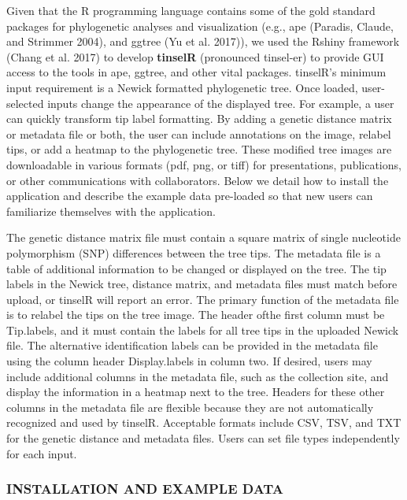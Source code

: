 \documentclass[
]{article}
\begin{document}
Given that the R programming language contains some of the gold standard
packages for phylogenetic analyses and visualization (e.g., ape
(Paradis, Claude, and Strimmer 2004), and ggtree (Yu et al. 2017)), we
used the Rshiny framework (Chang et al. 2017) to develop
\textbf{tinselR} (pronounced tinsel-er) to provide GUI access to the
tools in ape, ggtree, and other vital packages. tinselR's minimum input
requirement is a Newick formatted phylogenetic tree. Once loaded,
user-selected inputs change the appearance of the displayed tree. For
example, a user can quickly transform tip label formatting. By adding a
genetic distance matrix or metadata file or both, the user can include
annotations on the image, relabel tips, or add a heatmap to the
phylogenetic tree. These modified tree images are downloadable in
various formats (pdf, png, or tiff) for presentations, publications, or
other communications with collaborators. Below we detail how to install
the application and describe the example data pre-loaded so that new
users can familiarize themselves with the application.

The genetic distance matrix file must contain a square matrix of single
nucleotide polymorphism (SNP) differences between the tree tips. The
metadata file is a table of additional information to be changed or
displayed on the tree. The tip labels in the Newick tree, distance
matrix, and metadata files must match before upload, or tinselR will
report an error. The primary function of the metadata file is to relabel
the tips on the tree image. The header ofthe first column must be
Tip.labels, and it must contain the labels for all tree tips in the
uploaded Newick file. The alternative identification labels can be
provided in the metadata file using the column header Display.labels in
column two. If desired, users may include additional columns in the
metadata file, such as the collection site, and display the information
in a heatmap next to the tree. Headers for these other columns in the
metadata file are flexible because they are not automatically recognized
and used by tinselR. Acceptable formats include CSV, TSV, and TXT for
the genetic distance and metadata files. Users can set file types
independently for each input.

\hypertarget{installation-and-example-data}{%
\subsubsection{INSTALLATION AND EXAMPLE
DATA}\label{installation-and-example-data}}
\end{document}
